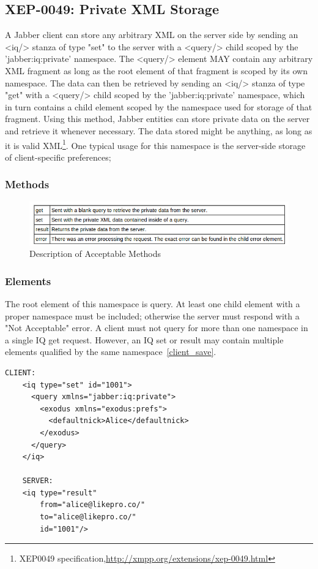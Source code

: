 \subsection{XEP-0049: Private XML Storage}
	A Jabber client can store any arbitrary XML on the server side by sending an <iq/> stanza of type "set" to the server with a <query/> child scoped by the 'jabber:iq:private' namespace. The <query/> element MAY contain any arbitrary XML fragment as long as the root element of that fragment is scoped by its own namespace. The data can then be retrieved by sending an <iq/> stanza of type "get" with a <query/> child scoped by the 'jabber:iq:private' namespace, which in turn contains a child element scoped by the namespace used for storage of that fragment. Using this method, Jabber entities can store private data on the server and retrieve it whenever necessary. The data stored might be anything, as long as it is valid XML\footnote{XEP0049 specification,\url{http://xmpp.org/extensions/xep-0049.html}}. One typical usage for this namespace is the server-side storage of client-specific preferences; 
	
	\subsubsection{Methods}
	\begin{figure}[!ht]
		\centering
		\includegraphics[scale=0.9]{images/xep0049Queries.png}   
		\caption[ Description of Acceptable Methods]{ Description of Acceptable Methods}
		\label{img:interfaces}                           
		\end{figure}
	\subsubsection{Elements}
	The root element of this namespace is query. At least one child element with a proper namespace must be included; otherwise the server must respond with a "Not Acceptable" error. A client must not query for more than one namespace in a single IQ get request. However, an IQ set or result may contain multiple elements qualified by the same namespace~\ref{client_save}.
    \begin{lstlisting}[label=client_save,caption=Client Stores Private Data]
	CLIENT:
	<iq type="set" id="1001">
	  <query xmlns="jabber:iq:private">
	    <exodus xmlns="exodus:prefs">
	      <defaultnick>Alice</defaultnick>
	    </exodus>
	  </query>
	</iq>

	SERVER:
	<iq type="result"
	    from="alice@likepro.co/"
	    to="alice@likepro.co/"
	    id="1001"/>
    \end{lstlisting}

